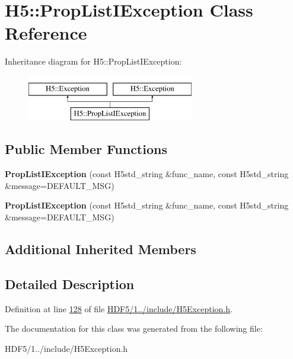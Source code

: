 \hypertarget{class_h5_1_1_prop_list_i_exception}{}\section{H5\+:\+:Prop\+List\+I\+Exception Class Reference}
\label{class_h5_1_1_prop_list_i_exception}
Inheritance diagram for H5\+:\+:Prop\+List\+I\+Exception\+:\begin{figure}[H]
\begin{center}
\leavevmode
\includegraphics[height=2.000000cm]{class_h5_1_1_prop_list_i_exception}
\end{center}
\end{figure}
\subsection*{Public Member Functions}
\begin{DoxyCompactItemize}
\item 
\mbox{\label{class_h5_1_1_prop_list_i_exception_a7d43c484f0a61e358411e41564b0805d}} 
{\bfseries Prop\+List\+I\+Exception} (const H5std\+\_\+string \&func\+\_\+name, const H5std\+\_\+string \&message=D\+E\+F\+A\+U\+L\+T\+\_\+\+M\+SG)
\item 
\mbox{\label{class_h5_1_1_prop_list_i_exception_a7d43c484f0a61e358411e41564b0805d}} 
{\bfseries Prop\+List\+I\+Exception} (const H5std\+\_\+string \&func\+\_\+name, const H5std\+\_\+string \&message=D\+E\+F\+A\+U\+L\+T\+\_\+\+M\+SG)
\end{DoxyCompactItemize}
\subsection*{Additional Inherited Members}


\subsection{Detailed Description}


Definition at line \hyperlink{_h_d_f5_21_810_81_2include_2_h5_exception_8h_source_l00128}{128} of file \hyperlink{_h_d_f5_21_810_81_2include_2_h5_exception_8h_source}{H\+D\+F5/1../include/\+H5\+Exception.\+h}.



The documentation for this class was generated from the following file\+:\begin{DoxyCompactItemize}
\item 
H\+D\+F5/1../include/\+H5\+Exception.\+h\end{DoxyCompactItemize}
